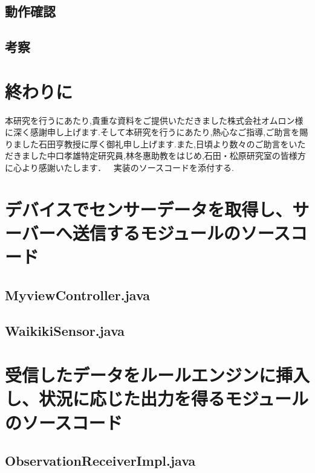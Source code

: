 \documentclass{kuisthesis}			%
\begin{document}
\subsection{動作確認}
\subsection{考察}





\section{終わりに}

\acknowledgments				%
本研究を行うにあたり,貴重な資料をご提供いただきました株式会社オムロン様に深く感謝申し上げます.そして本研究を行うにあたり,熱心なご指導,ご助言を賜りました石田亨教授に厚く御礼申し上げます.また,日頃より数々のご助言をいただきました中口孝雄特定研究員,林冬惠助教をはじめ,石田・松原研究室の皆様方に心より感謝いたします．

\nocite{*}

\Appendix[付録]
実装のソースコードを添付する.

\section{デバイスでセンサーデータを取得し、サーバーへ送信するモジュールのソースコード}
\subsection{MyviewController.java}


\subsection{WaikikiSensor.java}


\section{受信したデータをルールエンジンに挿入し、状況に応じた出力を得るモジュールのソースコード}

\subsection{ObservationReceiverImpl.java}

\end{document}
